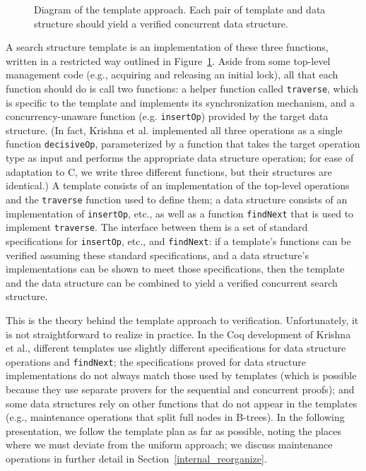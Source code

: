 \documentclass[sigplan,screen]{acmart}
\begin{document}
{\begin{figure}[htb]
	\caption{Diagram of the template approach. Each pair of template and data structure should yield a verified concurrent data structure.}
	\label{templates-diagram}
\end{figure}

A search structure template is an implementation of these three functions, written in a restricted way outlined in Figure~\ref{templates-diagram}. Aside from some top-level management code (e.g., acquiring and releasing an initial lock), all that each function should do is call two functions: a helper function called \lstinline{traverse}, which is specific to the template and implements its synchronization mechanism, and a concurrency-unaware function (e.g. \lstinline{insertOp}) provided by the target data structure. (In fact, Krishna et al. implemented all three operations as a single function \lstinline{decisiveOp}, parameterized by a function that takes the target operation type as input and performs the appropriate data structure operation; for ease of adaptation to C, we write three different functions, but their structures are identical.) A template consists of an implementation of the top-level operations and the \lstinline{traverse} function used to define them; a data structure consists of an implementation of \lstinline{insertOp}, etc., as well as a function \lstinline{findNext} that is used to implement \lstinline{traverse}. The interface between them is a set of standard specifications for \lstinline{insertOp}, etc., and \lstinline{findNext}: if a template's functions can be verified assuming these standard specifications, and a data structure's implementations can be shown to meet those specifications, then the template and the data structure can be combined to yield a verified concurrent search structure.

This is the theory behind the template approach to verification. Unfortunately, it is not straightforward to realize in practice. In the Coq development of Krishna et al., different templates use slightly different specifications for data structure operations and \lstinline{findNext}; the specifications proved for data structure implementations do not always match those used by templates (which is possible because they use separate provers for the sequential and concurrent proofs); and some data structures rely on other functions that do not appear in the templates (e.g., maintenance operations that split full nodes in B-trees). In the following presentation, we follow the template plan as far as possible, noting the places where we must deviate from the uniform approach; we discuss maintenance operations in further detail in Section~\ref{internal_reorganize}.

}
\end{document}
